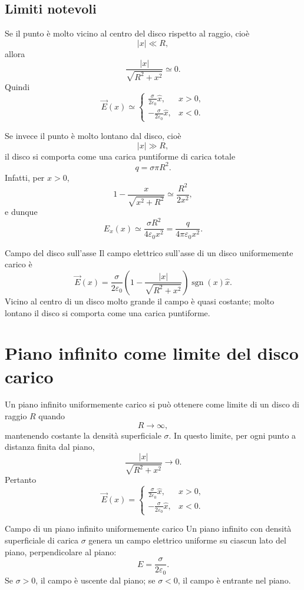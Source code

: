 \documentclass[a4paper]{article}
\begin{document}
\subsection{Limiti notevoli}

Se il punto è molto vicino al centro del disco rispetto al raggio, cioè
\[
    |x|\ll R,
\]
allora
\[
    \frac{|x|}{\sqrt{R^2+x^2}}\simeq0.
\]
Quindi
\[
    \vec{E}(x)\simeq
    \begin{cases}
        \displaystyle \frac{\sigma}{2\varepsilon_0}\hat{x}, & x>0,\\[6pt]
        \displaystyle -\frac{\sigma}{2\varepsilon_0}\hat{x}, & x<0.
    \end{cases}
\]

Se invece il punto è molto lontano dal disco, cioè
\[
    |x|\gg R,
\]
il disco si comporta come una carica puntiforme di carica totale
\[
    q=\sigma\pi R^2.
\]
Infatti, per \(x>0\),
\[
    1-\frac{x}{\sqrt{x^2+R^2}}\simeq \frac{R^2}{2x^2},
\]
e dunque
\[
    E_x(x)\simeq \frac{\sigma R^2}{4\varepsilon_0x^2}
    =\frac{q}{4\pi\varepsilon_0x^2}.
\]

\begin{snippetproposition}{Campo del disco sull'asse}
    Il campo elettrico sull'asse di un disco uniformemente carico è
    \[
        \vec{E}(x)=\frac{\sigma}{2\varepsilon_0}\left(1-\frac{|x|}{\sqrt{R^2+x^2}}\right)\operatorname{sgn}(x)\hat{x}.
    \]
    Vicino al centro di un disco molto grande il campo è quasi costante; molto lontano il disco si comporta come una carica puntiforme.
\end{snippetproposition}

\section{Piano infinito come limite del disco carico}

Un piano infinito uniformemente carico si può ottenere come limite di un disco di raggio \(R\) quando
\[
    R\to\infty,
\]
mantenendo costante la densità superficiale \(\sigma\). In questo limite, per ogni punto a distanza finita dal piano,
\[
    \frac{|x|}{\sqrt{R^2+x^2}}\to0.
\]
Pertanto
\[
    \vec{E}(x)=
    \begin{cases}
        \displaystyle \frac{\sigma}{2\varepsilon_0}\hat{x}, & x>0,\\[6pt]
        \displaystyle -\frac{\sigma}{2\varepsilon_0}\hat{x}, & x<0.
    \end{cases}
\]

\begin{snippettheorem}{Campo di un piano infinito uniformemente carico}
    Un piano infinito con densità superficiale di carica \(\sigma\) genera un campo elettrico uniforme su ciascun lato del piano, perpendicolare al piano:
    \[
        E=\frac{\sigma}{2\varepsilon_0}.
    \]
    Se \(\sigma>0\), il campo è uscente dal piano; se \(\sigma<0\), il campo è entrante nel piano.
\end{snippettheorem}
\end{document}
